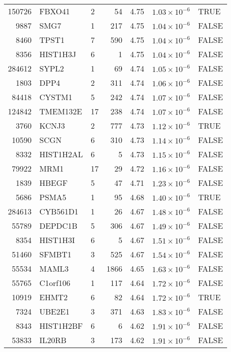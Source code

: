 \begin{table}[ht]
\begin{adjustbox}{totalheight=10in}
\begin{tabular}{rllrrrl}
  150726 & FBXO41 & 2 &  54 & 4.75 & $1.03 \times 10^{-6}$ & TRUE \\ 
  9887 & SMG7 & 1 & 217 & 4.75 & $1.04 \times 10^{-6}$ & FALSE \\ 
  8460 & TPST1 & 7 & 590 & 4.75 & $1.04 \times 10^{-6}$ & FALSE \\ 
  8356 & HIST1H3J & 6 &   1 & 4.75 & $1.04 \times 10^{-6}$ & FALSE \\ 
  284612 & SYPL2 & 1 &  69 & 4.74 & $1.05 \times 10^{-6}$ & FALSE \\ 
  1803 & DPP4 & 2 & 311 & 4.74 & $1.06 \times 10^{-6}$ & FALSE \\ 
  84418 & CYSTM1 & 5 & 242 & 4.74 & $1.07 \times 10^{-6}$ & FALSE \\ 
  124842 & TMEM132E & 17 & 238 & 4.74 & $1.07 \times 10^{-6}$ & FALSE \\ 
  3760 & KCNJ3 & 2 & 777 & 4.73 & $1.12 \times 10^{-6}$ & TRUE \\ 
  10590 & SCGN & 6 & 310 & 4.73 & $1.14 \times 10^{-6}$ & FALSE \\ 
  8332 & HIST1H2AL & 6 &   5 & 4.73 & $1.15 \times 10^{-6}$ & FALSE \\ 
  79922 & MRM1 & 17 &  29 & 4.72 & $1.16 \times 10^{-6}$ & FALSE \\ 
  1839 & HBEGF & 5 &  47 & 4.71 & $1.23 \times 10^{-6}$ & FALSE \\ 
  5686 & PSMA5 & 1 &  95 & 4.68 & $1.40 \times 10^{-6}$ & TRUE \\ 
  284613 & CYB561D1 & 1 &  26 & 4.67 & $1.48 \times 10^{-6}$ & FALSE \\ 
  55789 & DEPDC1B & 5 & 306 & 4.67 & $1.49 \times 10^{-6}$ & FALSE \\ 
  8354 & HIST1H3I & 6 &   5 & 4.67 & $1.51 \times 10^{-6}$ & FALSE \\ 
  51460 & SFMBT1 & 3 & 525 & 4.67 & $1.54 \times 10^{-6}$ & FALSE \\ 
  55534 & MAML3 & 4 & 1866 & 4.65 & $1.63 \times 10^{-6}$ & FALSE \\ 
  55765 & C1orf106 & 1 & 117 & 4.64 & $1.72 \times 10^{-6}$ & FALSE \\ 
  10919 & EHMT2 & 6 &  82 & 4.64 & $1.72 \times 10^{-6}$ & TRUE \\ 
  7324 & UBE2E1 & 3 & 371 & 4.63 & $1.83 \times 10^{-6}$ & FALSE \\ 
  8343 & HIST1H2BF & 6 &   6 & 4.62 & $1.91 \times 10^{-6}$ & FALSE \\ 
  53833 & IL20RB & 3 & 173 & 4.62 & $1.91 \times 10^{-6}$ & FALSE \\ 

\end{tabular}
\end{adjustbox}
\end{table}
